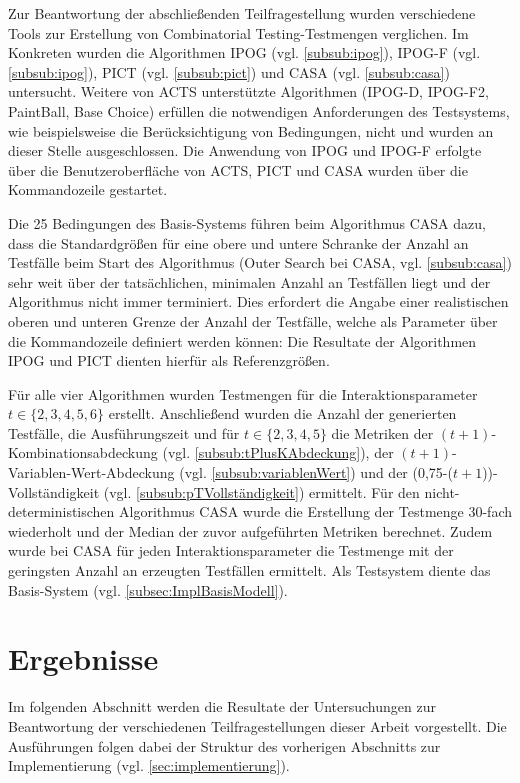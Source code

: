 Zur Beantwortung der abschließenden Teilfragestellung wurden verschiedene Tools zur Erstellung von Combinatorial Testing-Testmengen verglichen. Im Konkreten wurden die Algorithmen IPOG  (vgl. \autoref{subsub:ipog}), IPOG-F (vgl. \autoref{subsub:ipog}), PICT (vgl. \autoref{subsub:pict}) und CASA (vgl. \autoref{subsub:casa}) untersucht. Weitere von ACTS unterstützte Algorithmen (IPOG-D, IPOG-F2, PaintBall, Base Choice) erfüllen die notwendigen Anforderungen des Testsystems, wie beispielsweise die Berücksichtigung von Bedingungen, nicht und wurden an dieser Stelle ausgeschlossen. Die Anwendung von IPOG und IPOG-F erfolgte über die Benutzeroberfläche von ACTS, PICT und CASA wurden über die Kommandozeile gestartet.

Die 25 Bedingungen des Basis-Systems führen beim Algorithmus CASA dazu, dass die Standardgrößen für eine obere und untere Schranke der Anzahl an Testfälle beim Start des Algorithmus (Outer Search bei CASA, vgl. \autoref{subsub:casa}) sehr weit über der tatsächlichen, minimalen Anzahl an Testfällen liegt und der Algorithmus nicht immer terminiert. Dies erfordert die Angabe einer realistischen oberen und unteren Grenze der Anzahl der Testfälle, welche als Parameter über die Kommandozeile definiert werden können: Die Resultate der Algorithmen IPOG und PICT dienten hierfür als Referenzgrößen.

Für alle vier Algorithmen wurden Testmengen für die Interaktionsparameter $t \in \{2,3,4,5,6\}$ erstellt. Anschließend wurden die Anzahl der generierten Testfälle, die Ausführungszeit und für $t \in \{2,3,4,5\}$ die Metriken der $(t+1)$-Kombinationsabdeckung (vgl. \autoref{subsub:tPlusKAbdeckung}), der $(t+1)$-Variablen-Wert-Abdeckung (vgl. \autoref{subsub:variablenWert}) und der (0,75-($t+1$))-Vollständigkeit (vgl. \autoref{subsub:pTVollständigkeit}) ermittelt. Für den nicht-deterministischen Algorithmus CASA wurde die Erstellung der Testmenge 30-fach wiederholt und der Median der zuvor aufgeführten Metriken berechnet. Zudem wurde bei CASA für jeden Interaktionsparameter die Testmenge mit der geringsten Anzahl an erzeugten Testfällen ermittelt. Als Testsystem diente das Basis-System (vgl. \autoref{subsec:ImplBasisModell}). 

\section{Ergebnisse}\label{sec:results}

Im folgenden Abschnitt werden die Resultate der Untersuchungen zur Beantwortung der verschiedenen Teilfragestellungen dieser Arbeit vorgestellt. Die Ausführungen folgen dabei der Struktur des vorherigen Abschnitts zur Implementierung (vgl. \autoref{sec:implementierung}).


